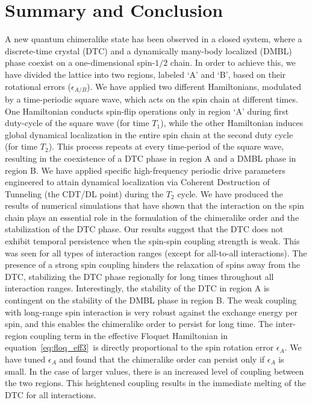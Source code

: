 \documentclass[12pt]{iopart}
\begin{document}
\section{\label{sec:level7} Summary and Conclusion}
A new quantum chimeralike state has been observed in a closed  system, where a discrete-time crystal (DTC) and a dynamically many-body localized (DMBL) phase coexist on a one-dimensional spin-$1/2$ chain. In order to achieve this, we have divided the lattice into two regions, labeled `A' and `B', based on their rotational errors ($\epsilon_{A/B}$). {We have applied two different Hamiltonians, modulated by a time-periodic square wave, which acts on the spin chain at different times. One Hamiltonian conducts spin-flip operations only in region `A' during first duty-cycle of the square wave (for time $T_1$), while the other Hamiltonian induces global dynamical localization in the entire spin chain at the second duty cycle (for time $T_2$). This process repeats at every time-period of the square wave, resulting in the coexistence of a DTC phase in region A and a DMBL phase in region B.} We have applied specific high-frequency periodic drive parameters engineered to attain dynamical localization via Coherent Destruction of Tunneling (the CDT/DL point) during the $T_2$ cycle. We have produced the results of numerical simulations that have shown that the interaction on the spin chain plays an essential role in the formulation of the chimeralike order and the stabilization of the DTC phase. Our results suggest that the DTC does not exhibit temporal persistence when the spin-spin coupling strength is weak. This was seen for all types of interaction ranges (except for all-to-all interactions). The presence of a strong spin coupling hinders the relaxation of spins away from the DTC, stabilizing the DTC phase regionally for long times throughout all interaction ranges. Interestingly, the stability of the DTC in region A is contingent on the stability of the DMBL phase in region B. The weak coupling with long-range spin interaction is very robust against the exchange energy per spin, and this enables the chimeralike order to persist for long time. 
The inter-region coupling term in the effective Floquet Hamiltonian in equation~\ref{eq:floq_eff3} is directly proportional to the spin rotation error $\epsilon_A$. We have tuned $\epsilon_A$ and found that the chimeralike order can persist only if $\epsilon_A$ is small. In the case of larger values, there is an increased level of coupling between the two regions. This heightened coupling results in the immediate melting of the DTC for all interactions.
	
\end{document}
